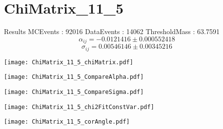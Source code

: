 \documentclass[a4paper,12pt]{article}
\begin{document}
\section{ChiMatrix\_11\_5}
\begin{minipage}{0.49\linewidth} Results \newline
MCEvents : 92016\newline
DataEvents : 14062 \newline
ThresholdMass : 63.7591\\
$$\alpha_{ij} = -0.0121416\pm 0.000552418$$
$$\sigma_{ij} = 0.00546146\pm 0.00345216$$
\end{minipage}\hfill
\begin{minipage}{0.49\linewidth} 
\texttt{[image: ChiMatrix\_11\_5\_chiMatrix.pdf]}\\
\end{minipage}
\hfill
\begin{minipage}{0.49\linewidth} 
\texttt{[image: ChiMatrix\_11\_5\_CompareAlpha.pdf]}\\
\end{minipage}
\hfill
\begin{minipage}{0.49\linewidth} 
\texttt{[image: ChiMatrix\_11\_5\_CompareSigma.pdf]}\\
\end{minipage}
\begin{minipage}{0.49\linewidth} 
\texttt{[image: ChiMatrix\_11\_5\_chi2FitConstVar.pdf]}\\
\end{minipage}
\hfill
\begin{minipage}{0.49\linewidth} 
\texttt{[image: ChiMatrix\_11\_5\_corAngle.pdf]}\\
\end{minipage}
\end{document}
